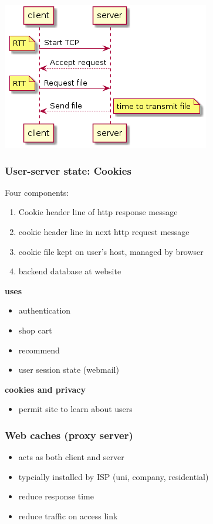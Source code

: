 \documentclass[11pt]{article}
\begin{document}
\begin{center}
\includegraphics[width=.9\linewidth]{../img/http.png}
\end{center}

\subsubsection{User-server state: Cookies}
\label{sec:org1958af9}
Four components:
\begin{enumerate}
\item Cookie header line of http response message
\item cookie header line in next http request message
\item cookie file kept on user's host, managed by browser
\item backend database at website
\end{enumerate}

\textbf{uses}
\begin{itemize}
\item authentication
\item shop cart
\item recommend
\item user session state (webmail)
\end{itemize}

\textbf{cookies and privacy}
\begin{itemize}
\item permit site to learn about users
\end{itemize}

\subsubsection{Web caches (proxy server)}
\label{sec:org64d7f2b}
\begin{itemize}
\item acts as both client and server
\item typcially installed by ISP (uni, company, residential)
\item reduce response time
\item reduce traffic on access link
\end{itemize}
\end{document}
